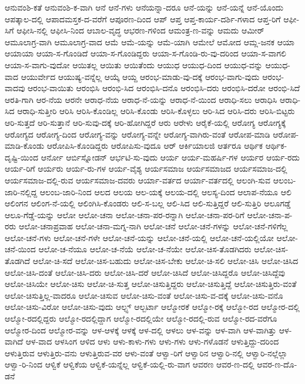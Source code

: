 {ಆನುವಂಶಿ-ಕತೆ
ಆನುವಂಶಿ-ಕ-ವಾಗಿ
ಆನೆ
ಆನೆ-ಗಳು
ಆನೆಯನ್ನಾ-ದರೂ
ಆನೆ-ಯನ್ನು
ಆನೆ-ಯನ್ನೆ
ಆನೆ-ಯೊಂದು
ಆಪತ್ಕಾಲ-ದಲ್ಲಿ
ಆಪಾದಮಸ್ತಕ-ದ-ವರೆಗೆ
ಆಪೂರಣ-ದಿಂದ
ಆಪ್
ಆಪ್ತ
ಆಪ್ತ-ಕಾರ್ಯ-ದರ್ಶಿ-ಗಳಾದ
ಆಪ್ತ-ರಿಗೆ
ಆಫೀ-ಸಿಗೆ
ಆಫೀಸಿ-ನಲ್ಲಿ
ಆಫೀಸಿ-ನಿಂದ
ಆಬಾಲ-ವೃದ್ಧ
ಆಭರಣ-ಗಳಿಂದ
ಆಮಂತ್ರ-ಣ-ವನ್ನು
ಆಮದು
ಆಮೀರ್
ಆಮೂಲಾಗ್ರ-ವಾಗಿ
ಆಮೂಲಾಗ್ರ-ವಾದ
ಆಮೆ
ಆಮೆ-ಯನ್ನು
ಆಮೆ-ಯಾಗಿ
ಆಮೇಲೆ
ಆಮೋದ
ಆಮ್ಲ-ಜನಕ
ಆಯಾ
ಆಯಾಯಾ
ಆಯಾ-ಸ-ಗೊಂಡಿದೆ
ಆಯಾ-ಸ-ಗೊಂಡಿದ್ದರು
ಆಯಾ-ಸ-ಗೊಂಡಿ-ರು-ವು-ದರಿಂದ
ಆಯಾ-ಸ-ವಾಗಲಿ
ಆಯಾ-ಸ-ವಾಗು-ವುದೋ
ಆಯಿತಲ್ಲ
ಆಯಿತು
ಆಯಿತೆಂದು
ಆಯುಧ
ಆಯುಧ-ದಿಂದ
ಆಯುಧ-ವನ್ನು
ಆಯುಧ-ವಾದ
ಆಯುರ್ವೇದ
ಆಯುಷ್ಯ-ವನ್ನೆಲ್ಲ
ಆಯ್ಕೆ
ಆಯ್ದ
ಆರಂಭ-ಮಾಡು-ವು-ದಕ್ಕೆ
ಆರಂಭ-ವಾಗು-ವುದು
ಆರಂಭ-ವಾದವು
ಆರಂಭ-ವಾಯಿತು
ಆರಂಭಿಸಿ
ಆರಂಭಿ-ಸಿದ
ಆರಂಭಿಸಿ-ದನೊ
ಆರಂಭಿಸಿ-ದರು
ಆರಂಭಿಸಿ-ದರೋ
ಆರಂಭಿ-ಸಿದೆ
ಆರತಿ-ಗಾಗಿ
ಆರ-ನೆಯ
ಆರನೇ
ಆರಾಧ-ನೆಯ
ಆರಾಧ-ನೆ-ಯನ್ನು
ಆರಾಧ-ನೆ-ಯಿಂದ
ಆರಾಧಿ-ಸಲು
ಆರಾಧಿಸಿ
ಆರಾಧಿ-ಸಿದ
ಆರಾಧಿ-ಸುತ್ತೀರಿ
ಆರಿಸಿ
ಆರಿಸಿ-ಕೊಂಡಿಲ್ಲ
ಆರಿಸಿ-ಕೊಂಡು
ಆರಿಸಿ-ಕೊಳ್ಳಲು
ಆರಿ-ಸಿದ
ಆರಿಸಿ-ದರು
ಆರಿಸಿ-ಬಿಟ್ಟರು
ಆರಿ-ಸುತ್ತದೆ
ಆರಿ-ಸುತ್ತಾನೆ
ಆರಿ-ಸುವು-ದಕ್ಕೆ
ಆರಿ-ಹೋಗಿದ್ದರೆ
ಆರು
ಆರೇಳು
ಆರೈಕೆ-ಯಲ್ಲಿ
ಆರೋಗ್ಯ
ಆರೋಗ್ಯಕ್ಕೆ
ಆರೋಗ್ಯದ
ಆರೋಗ್ಯ-ದಿಂದ
ಆರೋಗ್ಯ-ವನ್ನು
ಆರೋಗ್ಯ-ವನ್ನೇ
ಆರೋಗ್ಯ-ವಾಗಿರು-ವಂತೆ
ಆರೋಪ-ಮಾಡಿ
ಆರೋಪ-ಮಾಡಿ-ಕೊಂಡು
ಆರೋಪಿಸಿ-ಕೊಂಡಿದ್ದರು
ಆರೋಪಿಸು-ವುದೂ
ಆರ್
ಆರ್ಕಿಯಾಲಜಿ
ಆರ್ತರೂ
ಆರ್ಥಿಕ
ಆರ್ಥಿಕ-ದೃಷ್ಟಿ-ಯಿಂದ
ಆರ್ನೋ
ಆರ್ಬಿಸ್ನೋಡನ್
ಆರ್ಭಟಿ-ಸು-ವುದು
ಆರ್ಯ
ಆರ್ಯ-ಮಹರ್ಷಿ-ಗಳ
ಆರ್ಯರ
ಆರ್ಯ-ರದು
ಆರ್ಯ-ರಿಗೆ
ಆರ್ಯರು
ಆರ್ಯ-ರು-ಗಳ
ಆರ್ಯ-ವೈಶ್ಯ
ಆರ್ಯಸಮಾಜ
ಆರ್ಯಸಮಾಜದ
ಆರ್ಯಸಮಾಜ-ದಲ್ಲಿ
ಆರ್ಯಸಮಾಜ-ದಲ್ಲಿ-ರುವ
ಆರ್ಯಸಮಾಜ-ದವರು
ಆರ್ಯಾ-ವರ್ತದ
ಆರ್ಯಾ-ವರ್ತದಲ್ಲಿ
ಆಲಂಗಿ-ಸುವ
ಆಲಂಬ-ಜಾರಿ-ನಲ್ಲಿದ್ದ
ಆಲಂಬ-ಜಾರಿ-ನಿಂದ
ಆಲದ
ಆಲಯ
ಆಲ-ಯಕ್ಕೆ
ಆಲಯ-ದಲ್ಲಿ
ಆಲಸ್ಯ-ದಿಂದ
ಆಲಾಪ-ನೆಯೂ
ಆಲಿ
ಆಲಿಂಗನ
ಆಲಿಂಗ-ನೆ-ಯಲ್ಲಿ
ಆಲಿಂಗಿಸಿ-ಕೊಂಡರು
ಆಲಿ-ಸ-ಬಲ್ಲ
ಆಲಿ-ಸಿದ
ಆಲಿ-ಸುತ್ತಿದ್ದರೆ
ಆಲಿ-ಸುತ್ತಿರಿ
ಆಲೂಗಡ್ಡೆ
ಆಲೂ-ಗೆಡ್ಡೆ-ಯನ್ನು
ಆಲೋ
ಆಲೋ-ಚನಾ
ಆಲೋ-ಚನಾ-ಪರ-ರನ್ನಾಗಿ
ಆಲೋ-ಚನಾ-ಪರ-ರಿಗೆ
ಆಲೋ-ಚನಾ-ಪ-ರರು
ಆಲೋ-ಚನಾಪ್ರವಾಹ
ಆಲೋ-ಚನಾ-ಮಗ್ನ-ನಾಗಿ
ಆಲೋ-ಚನೆ
ಆಲೋ-ಚನೆ-ಗಳನ್ನು
ಆಲೋ-ಚನೆ-ಗಳಿಗೆಲ್ಲ
ಆಲೋ-ಚನೆ-ಗಳು
ಆಲೋ-ಚನೆ-ಗಳೇ
ಆಲೋ-ಚನೆ-ಯನ್ನು
ಆಲೋ-ಚನೆ-ಯಲ್ಲಿ
ಆಲೋ-ಚನೆ-ಯಲ್ಲಿಯೋ
ಆಲೋ-ಚನೆ-ಯಿಂದ
ಆಲೋ-ಚ-ನೆಯೂ
ಆಲೋ-ಚ-ನೆಯೆ
ಆಲೋ-ಚ-ನೆಯೇ
ಆಲೋ-ಚಿಸ-ತೊಡಗಿದರು
ಆಲೋ-ಚಿಸ-ತೊಡಗಿದೆ
ಆಲೋ-ಚಿ-ಸದೆ
ಆಲೋ-ಚಿಸ-ಬಹುದು
ಆಲೋ-ಚಿಸ-ಬೇಕು
ಆಲೋ-ಚಿ-ಸಲಿ
ಆಲೋ-ಚಿಸಿ
ಆಲೋ-ಚಿಸಿದ
ಆಲೋ-ಚಿಸಿ-ದಂತೆ
ಆಲೋ-ಚಿಸಿ-ದರು
ಆಲೋ-ಚಿಸಿ-ದರೆ
ಆಲೋ-ಚಿಸಿದೆ
ಆಲೋ-ಚಿಸಿದ್ದರೊ
ಆಲೋ-ಚಿಸಿದ್ದೆವು
ಆಲೋ-ಚಿಸಿಯೇ
ಆಲೋ-ಚಿಸು
ಆಲೋ-ಚಿ-ಸುತ್ತ
ಆಲೋ-ಚಿಸುತ್ತಿದ್ದರು
ಆಲೋ-ಚಿಸುತ್ತಿದ್ದೆ
ಆಲೋ-ಚಿಸುತ್ತಿರು-ವಂತೆ
ಆಲೋ-ಚಿಸುತ್ತಿಲ್ಲ-ವಾದರೂ
ಆಲೋ-ಚಿಸುವ
ಆಲೋ-ಚಿಸು-ವಂತೆ
ಆಲೋ-ಚಿಸು-ವ-ದಕ್ಕೆ
ಆಲೋ-ಚಿಸು-ವನೊ
ಆಲೋ-ಚಿಸು-ವಿರೋ
ಆಲೋ-ಚಿಸು-ವುದು
ಆಲ್ಫ್ಸ್
ಆಲ್ಬರ್ಟಾ
ಆಲ್ಮೋರಕೆ
ಆಲ್ಮೋ-ರಕ್ಕೆ
ಆಲ್ಮೋ-ರದ
ಆಲ್ಮೋರ-ದಲ್ಲಿ
ಆಲ್ಮೋ-ರದಲ್ಲಿದ್ದರು
ಆಲ್ಮೋ-ರದಲ್ಲಿದ್ದಾಗ
ಆಲ್ಮೋ-ರದಲ್ಲಿಯೇ
ಆಲ್ಮೋ-ರದಲ್ಲಿ-ರುವ
ಆಲ್ಮೋ-ರದ-ವರೆಗೂ
ಆಲ್ಮೋರ-ದಿಂದ
ಆಲ್ಮೋರ-ವನ್ನು
ಆಳ-ಆಳಕ್ಕೆ
ಆಳಕ್ಕೆ
ಆಳ-ದಲ್ಲಿ
ಆಳಲು
ಆಳ-ವನ್ನು
ಆಳ-ವಾಗಿ
ಆಳ-ವಾಗಿತ್ತು
ಆಳ-ವಾಗಿದೆ
ಆಳ-ವಾದ
ಆಳಸಿಂಗ
ಆಳಿದ
ಆಳು
ಆಳು-ಕಾಳು-ಗಳು
ಆಳು-ಗಳು
ಆಳು-ಗಳೊಡನೆ
ಆಳುತ್ತಿದ್ದು-ದರಿಂದ
ಆಳುತ್ತಿರುವ
ಆಳುತ್ತಿರು-ವನು
ಆಳುತ್ತಿರುವ-ವರ
ಆಳು-ವಂತೆ
ಆಳ್ವಾ-ರಿಗೆ
ಆಳ್ವಾರಿನ
ಆಳ್ವಾರಿ-ನಲ್ಲಿ
ಆಳ್ವಾರಿ-ನಲ್ಲೆಲ್ಲಾ
ಆಳ್ವಾ-ರಿ-ನಿಂದ
ಆಳ್ವಿಕೆ
ಆಳ್ವಿಕೆಯ
ಆಳ್ವಿಕೆ-ಯನ್ನೆಲ್ಲ
ಆಳ್ವಿಕೆ-ಯಲ್ಲಿ-ರು-ವಾಗ
ಆವರಣ
ಆವರ-ಣ-ದಲ್ಲಿ
ಆವರ-ಣ-ದೊ-ಡನೆ
}
